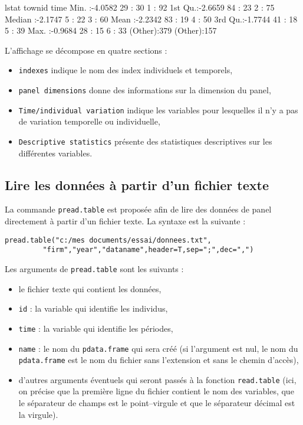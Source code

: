 \documentclass[a4paper]{article}
\begin{document}
\begin{Schunk}
\begin{Soutput}
     lstat             townid         time    
 Min.   :-4.0582   29     : 30   1      : 92  
 1st Qu.:-2.6659   84     : 23   2      : 75  
 Median :-2.1747   5      : 22   3      : 60  
 Mean   :-2.2342   83     : 19   4      : 50  
 3rd Qu.:-1.7744   41     : 18   5      : 39  
 Max.   :-0.9684   28     : 15   6      : 33  
                   (Other):379   (Other):157  
\end{Soutput}
\end{Schunk}

L'affichage se décompose en quatre sections :

\begin{itemize}
\item \texttt{indexes} indique le nom des index individuels et temporels,
\item \texttt{panel dimensions} donne des informations sur la
  dimension du  panel,
\item \texttt{Time/individual variation} indique les variables pour
lesquelles il n'y a pas de variation temporelle ou individuelle,
\item \texttt{Descriptive statistics} présente des statistiques
descriptives sur les différentes variables.
\end{itemize}

\subsection{Lire les données à partir d'un fichier texte}

La commande \texttt{pread.table} est proposée afin de lire des données
de panel directement à partir d'un fichier texte. La syntaxe est la
suivante :

\begin{verbatim}
pread.table("c:/mes documents/essai/donnees.txt",
         "firm","year","dataname",header=T,sep=";",dec=",")
\end{verbatim}

Les arguments de \texttt{pread.table} sont les suivants :

\begin{itemize}
\item le fichier texte qui contient les données,
\item \texttt{id} : la variable qui identifie les individus,
\item \texttt{time} : la variable qui identifie les périodes,
\item \texttt{name} : le nom du \texttt{pdata.frame} qui sera créé (si l'argument est nul, le nom du \texttt{pdata.frame}
  est le nom du fichier sans l'extension et sans le chemin d'accès),
\item d'autres arguments éventuels qui seront passés à la fonction
  \texttt{read.table} (ici, on précise que la première ligne du
  fichier contient le nom des variables, que le séparateur de champs
  est le point--virgule et que le séparateur décimal est la virgule).
\end{itemize}
\end{document}
